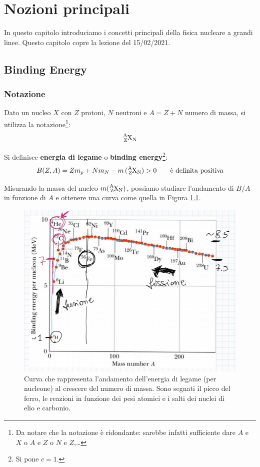 \chapter{Nozioni principali}
In questo capitolo introduciamo i concetti principali della fisica nucleare a grandi linee. Questo capitolo copre la lezione del 15/02/2021.
\section{Binding Energy}
\subsection{Notazione} 
Dato un nucleo $X$ con $Z$ protoni, $N$ neutroni e $A=Z+N$ numero di massa, si utilizza la notazione\footnote{Da notare che la notazione è ridondante: sarebbe infatti sufficiente dare $A$ e $X$ o $A$ e $Z$ o $N$ e $Z$,\dots}:
$$\ce{^{A}_{Z}X_N}$$

\begin{definition}
Si definisce \textbf{energia di legame} o \textbf{binding energy}\footnote{Si pone $c=1$.}:
$$B(Z,A) = Z m_p + N m_N - m \,(\ce{^{A}_{Z}X_N})>0\qquad \text{è definita positiva}$$
\end{definition}
\noindent Misurando la massa del nucleo $m (\ce{^{A}_{Z}X_N})$, possiamo studiare l'andamento di $B/A$ in funzione di $A$ e ottenere una curva come quella in Figura \ref{B/A}.

\begin{figure}[h]
    \centering
    \includegraphics[scale=0.26]{Immagini/curva_elementi.png}
    \caption{Curva che rappresenta l'andamento dell'energia di legame (per nucleone) al crescere del numero di massa. Sono segnati il picco del ferro, le reazioni in funzione dei pesi atomici e i salti dei nuclei di elio e carbonio.}
    \label{B/A}
\end{figure}

